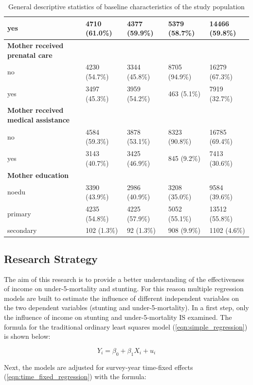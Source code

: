 \documentclass[a4paper, 11pt]{article} %
\begin{document}
\begin{table}[!htbp]
{{\begin{tabular}{lllll}
    yes &	4710 (61.0\%) &	4377 (59.9\%) &	5379 (58.7\%) & 14466 (59.8\%) \\ \hline
    \textbf{Mother received prenatal care} & & & &  \\						
    no &	4230 (54.7\%) &	3344 (45.8\%) &	8705 (94.9\%) & 16279 (67.3\%) \\
    yes &	3497 (45.3\%) &	3959 (54.2\%) &	463 (5.1\%) & 7919 (32.7\%) \\ \hline
    \textbf{Mother received medical assistance} & & & &  \\						
    no	& 4584 (59.3\%) &	3878 (53.1\%) &	8323 (90.8\%) &	16785 (69.4\%) \\
    yes	& 3143 (40.7\%) &	3425 (46.9\%) &	845 (9.2\%) &	7413 (30.6\%) \\ \hline
    \textbf{Mother education} & & & &  \\						
    noedu &	3390 (43.9\%) &	2986 (40.9\%) &	3208 (35.0\%) & 9584 (39.6\%) \\
    primary &	4235 (54.8\%) &	4225 (57.9\%) &	5052 (55.1\%) & 13512 (55.8\%) \\
    secondary &	102 (1.3\%) &	92 (1.3\%) &	908 (9.9\%) & 1102 (4.6\%) \\ \hline
    \end{tabular}
  }}
  \caption{General descriptive statistics of baseline characteristics of the study population}
  \label{table:descriptive_gen}
\end{table}

\subsection*{Research Strategy}

The aim of this research is to provide a better understanding of the effectiveness of income on under-5-mortality and stunting. For this reason multiple regression models are built to estimate the influence of different independent variables on the two dependent variables (stunting and under-5-mortality). In a first step, only the influence of income on stunting and under-5-mortality IS examined. The formula for the traditional ordinary least squares model (\ref{eqn:simple_regression}) is shown below:

\begin{equation}
 Y_i = \beta_0 + \beta_1 X_i + u_i
 \label{eqn:simple_regression}
\end{equation}

Next, the models are adjusted for survey-year time-fixed effects (\ref{eqn:time_fixed_regression}) with the formula:
\end{document}

